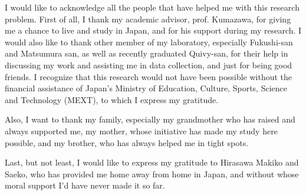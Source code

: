 

\begin{acknowledgements}      %

I would like to acknowledge all the people that have helped me with this research problem. First of all, I thank my academic advisor, prof. Kumazawa, for giving me a chance to live and study in Japan, and for his support during my research. 
I would also like to thank other member of my laboratory, especially Fukushi-san and Matsumura san, as well as recently graduated Quivy-san, for their help in discussing my work and assisting me in data collection, and just for being good friends. 
I recognize that this research would not have been possible without the financial assistance of Japan’s Ministry of Education, Culture, Sports, Science and Technology (MEXT), to which I express my gratitude.

Also, I want to thank my family, especially my grandmother who has raised and always supported me, my mother, whose initiative has made my study here possible, and my brother, who has always helped me in tight spots. 

Last, but not least, I would like to express my gratitude to Hirasawa Makiko and Saeko, who has provided me home away from home in Japan, and without whose moral support I'd have never made it so far.

\end{acknowledgements}



